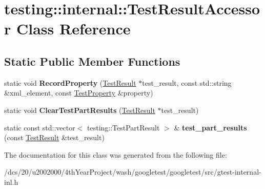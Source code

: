 \hypertarget{classtesting_1_1internal_1_1TestResultAccessor}{}\section{testing\+:\+:internal\+:\+:Test\+Result\+Accessor Class Reference}
\label{classtesting_1_1internal_1_1TestResultAccessor}
\subsection*{Static Public Member Functions}
\begin{DoxyCompactItemize}
\item 
\mbox{\label{classtesting_1_1internal_1_1TestResultAccessor_abcc4b32d1b201eeef92f0ec0ae161cf9}} 
static void {\bfseries Record\+Property} (\mbox{\hyperlink{classtesting_1_1TestResult}{Test\+Result}} $\ast$test\+\_\+result, const std\+::string \&xml\+\_\+element, const \mbox{\hyperlink{classtesting_1_1TestProperty}{Test\+Property}} \&property)
\item 
\mbox{\label{classtesting_1_1internal_1_1TestResultAccessor_a53c626632bac65d82d88e432072b866b}} 
static void {\bfseries Clear\+Test\+Part\+Results} (\mbox{\hyperlink{classtesting_1_1TestResult}{Test\+Result}} $\ast$test\+\_\+result)
\item 
\mbox{\label{classtesting_1_1internal_1_1TestResultAccessor_a55d771904317c1b0cc380104d175f1db}} 
static const std\+::vector$<$ testing\+::\+Test\+Part\+Result $>$ \& {\bfseries test\+\_\+part\+\_\+results} (const \mbox{\hyperlink{classtesting_1_1TestResult}{Test\+Result}} \&test\+\_\+result)
\end{DoxyCompactItemize}


The documentation for this class was generated from the following file\+:\begin{DoxyCompactItemize}
\item 
/dcs/20/u2002000/4th\+Year\+Project/wash/googletest/googletest/src/gtest-\/internal-\/inl.\+h\end{DoxyCompactItemize}
